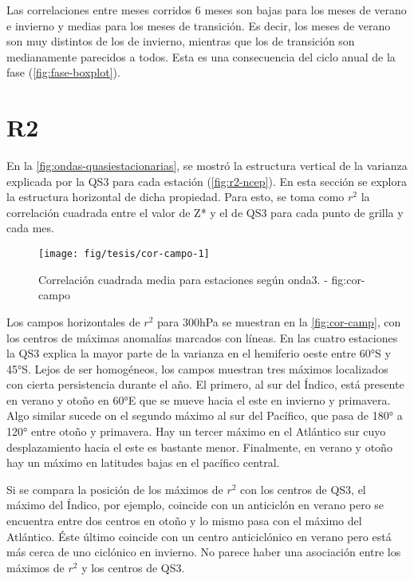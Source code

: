 \documentclass[spanish,a4paper,12p]{book}
\begin{document}
Las correlaciones entre meses corridos 6 meses son bajas para los meses
de verano e invierno y medias para los meses de transición. Es decir,
los meses de verano son muy distintos de los de invierno, mientras que
los de transición son medianamente parecidos a todos. Esta es una
consecuencia del ciclo anual de la fase (\autoref{fig:fase-boxplot}).

\section{R2}\label{r2}

En la \autoref{fig:ondas-quasiestacionarias}, se mostró la estructura
vertical de la varianza explicada por la QS3 para cada estación
(\autoref{fig:r2-ncep}). En esta sección se explora la estructura
horizontal de dicha propiedad. Para esto, se toma como \(r^2\) la
correlación cuadrada entre el valor de Z* y el de QS3 para cada punto de
grilla y cada mes.

\begin{figure*}
\texttt{[image: fig/tesis/cor-campo-1]} \caption{Correlación cuadrada media para estaciones según onda3. - fig:cor-campo}\label{fig:cor-campo}
\end{figure*}

Los campos horizontales de \(r^2\) para 300hPa se muestran en la
\autoref{fig:cor-camp}, con los centros de máximas anomalías marcados
con líneas. En las cuatro estaciones la QS3 explica la mayor parte de la
varianza en el hemiferio oeste entre 60°S y 45°S. Lejos de ser
homogéneos, los campos muestran tres máximos localizados con cierta
persistencia durante el año. El primero, al sur del Índico, está
presente en verano y otoño en 60°E que se mueve hacia el este en
invierno y primavera. Algo similar sucede on el segundo máximo al sur
del Pacífico, que pasa de 180° a 120° entre otoño y primavera. Hay un
tercer máximo en el Atlántico sur cuyo desplazamiento hacia el este es
bastante menor. Finalmente, en verano y otoño hay un máximo en latitudes
bajas en el pacífico central.

Si se compara la posición de los máximos de \(r^2\) con los centros de
QS3, el máximo del Índico, por ejemplo, coincide con un anticiclón en
verano pero se encuentra entre dos centros en otoño y lo mismo pasa con
el máximo del Atlántico. Éste último coincide con un centro
anticiclónico en verano pero está más cerca de uno ciclónico en
invierno. No parece haber una asociación entre los máximos de \(r^2\) y
los centros de QS3.
\end{document}
